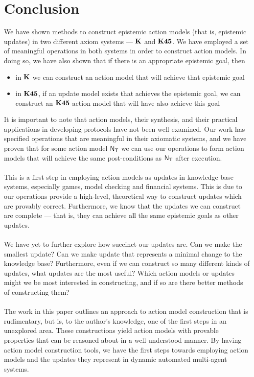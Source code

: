 \chapter{Conclusion}

We have shown methods to construct epistemic action models (that is, epistemic updates) in two different axiom systems --- $\bf K$
and $\bf K45$.
We have employed a set of meaningful operations in both systems in order to construct action models.
In doing so, we have also shown that if there is an appropriate epistemic goal, then
\begin{itemize}
	\item in $\bf K$ we can construct an action model that will achieve that epistemic goal
	\item in $\bf K45$, if an update model exists that achieves the epistemic goal, we can construct an
$\bf K45$ action model that will have also achieve this goal
\end{itemize}

It is important to note that action models, their synthesis, and their practical applications in
developing protocols have not been well examined.
Our work has specified operations that are meaningful in their axiomatic systems, and we have proven
that for some action model $\mathrm{\mathsf{N}}_\mathrm{\mathsf{T}}$ we can use our operations to form action models that will
achieve the same post-conditions as $\mathrm{\mathsf{N}}_\mathrm{\mathsf{T}}$ after execution.\\
\\
This is a first step in employing action models as updates in knowledge base systems, especially
games, model checking and financial systems.
This is due to our operations provide a high-level, theoretical way to construct updates which are
provably correct.
Furthermore, we know that the updates we can construct are complete --- that is, they can achieve
all the same epistemic goals as other updates.\\
\\
We have yet to further explore how succinct our updates are.
Can we make the smallest update?
Can we make update that represents a minimal change to the knowledge base?
Furthermore, even if we can construct so many different kinds of updates, what updates are the most
useful?
Which action models or updates might we be most interested in constructing, and if so are there
better methods of constructing them?\\
\\
The work in this paper outlines an approach to action model construction that is rudimentary, but is,
to the author's knowledge, one of the first steps in an unexplored area.
These constructions yield action models with provable properties that can be reasoned about in a
well-understood manner.
By having action model construction tools, we have the first steps towards employing action models and
the updates they represent in dynamic automated multi-agent systems.

